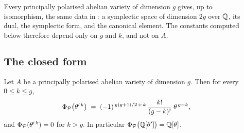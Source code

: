 \begin{remark}\label{rem:universal}
Every principally polarised abelian variety of dimension $g$ gives, up to
isomorphism, the same data in : a symplectic space of
dimension $2g$ over $\mathbb{Q}$, its dual, the symplectic form, and the canonical
element. The constants computed
below therefore depend only on $g$ and $k$, and not on $A$.
\end{remark}

\subsection{The closed form}

\begin{theorem}\label{thm:fmtheta}
Let $A$ be a principally polarised abelian variety of dimension $g$. Then for
every $0\le k\le g$,
\begin{equation}\label{eq:fmtheta}
  \Phi_{\mathcal{P}}\bigl(\theta'^{\,k}\bigr)
  \;=\;(-1)^{\,g(g+1)/2\,+\,k}\,\frac{k!}{(g-k)!}\;\theta^{\,g-k},
\end{equation}
and $\Phi_{\mathcal{P}}(\theta'^{\,k})=0$ for $k>g$. In particular
$\Phi_{\mathcal{P}}\bigl(\mathbb{Q}[\theta']\bigr)=\mathbb{Q}[\theta]$.
\end{theorem}


